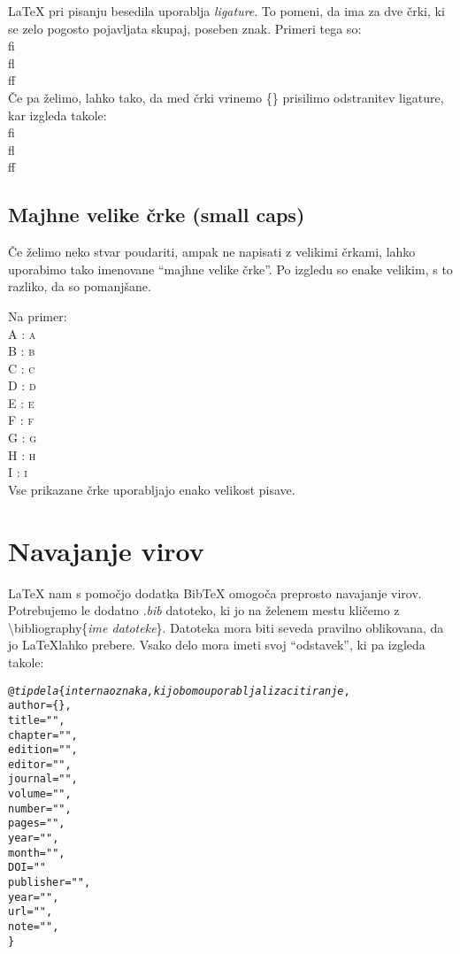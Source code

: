 \documentclass[a4paper]{book}
\newcommand\cmsc[2]{{\huge #1} : {\huge \textsc{#2}}}		%
\newcommand\tbs{\textbackslash{}}
\begin{document}
\LaTeX{} pri pisanju besedila uporablja \textit{ligature}. To pomeni, da ima za dve črki, ki se zelo pogosto pojavljata skupaj, poseben znak. Primeri tega so:\\[15pt]
{\Huge fi}\\[15pt]
{\Huge fl}\\[15pt]
{\Huge ff}\\[15pt]
Če pa želimo, lahko tako, da med črki vrinemo \{\} prisilimo odstranitev ligature, kar izgleda takole:\\[15pt]
{\Huge f{}i}\\[15pt]
{\Huge f{}l}\\[15pt]
{\Huge f{}f}\\[15pt]

\subsection{Majhne velike črke (small caps)}

Če želimo neko stvar poudariti, ampak ne napisati z velikimi črkami, lahko uporabimo tako imenovane ``majhne velike črke''. Po izgledu so enake velikim, s to razliko, da so pomanjšane. 

Na primer:\\
\cmsc{A}{a}\\
\cmsc{B}{b}\\
\cmsc{C}{c}\\
\cmsc{D}{d}\\
\cmsc{E}{e}\\
\cmsc{F}{f}\\
\cmsc{G}{g}\\
\cmsc{H}{h}\\
\cmsc{I}{i}\\

Vse prikazane črke uporabljajo enako velikost pisave. 


\section{Navajanje virov}

\LaTeX{} nam s pomočjo dodatka Bib\TeX{} omogoča preprosto navajanje virov. Potrebujemo le dodatno \textit{.bib} datoteko, ki jo na želenem mestu kličemo z \tbs{}bibliography\{\textit{ime datoteke}\}. Datoteka mora biti seveda pravilno oblikovana, da jo \LaTeX lahko prebere.
Vsako delo mora imeti svoj ``odstavek'', ki pa izgleda takole:

\begin{alltt}

@\textit{tip dela}\{\textit{interna oznaka, ki jo bomo uporabljali za citiranje},
  author = \{\},
  title = "",
  chapter = "",
  edition = "",
  editor = "",
  journal = "",
  volume = "",
  number = "",
  pages = "",
  year = "",
  month = "",
  DOI = ""
  publisher = "",
  year = "",
  url = "",
  note = "",
\}

\end{alltt}
\end{document}
